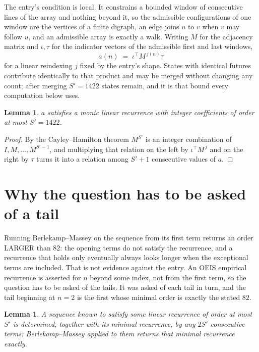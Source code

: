 \documentclass[11pt,a4paper]{article}
\theoremstyle{plain}
\newtheorem{lemma}[theorem]{Lemma}
\theoremstyle{definition}
\begin{document}
The entry's condition is local. It constrains a bounded window of consecutive lines of the
array and nothing beyond it, so the admissible configurations of one window are the vertices of
a finite digraph, an edge joins $u$ to $v$ when $v$ may follow $u$, and an admissible array is
exactly a walk. Writing $M$ for the adjacency matrix and $\iota,\tau$ for the indicator vectors
of the admissible first and last windows,
\[
a(n)\;=\;\iota^{\!\top}M^{\,j(n)}\tau
\]
for a linear reindexing $j$ fixed by the entry's shape. States with identical futures
contribute identically to that product and may be merged without changing any count; after
merging $S'=1422$ states remain, and it is that bound every computation below uses.

\begin{lemma}\label{lem:cf}
$a$ satisfies a monic linear recurrence with integer coefficients of order at most $S'=1422$.
\end{lemma}

\begin{proof}
By the Cayley--Hamilton theorem $M^{S'}$ is an integer combination of $I,M,\dots,M^{S'-1}$,
and multiplying that relation on the left by $\iota^{\!\top}M^{\,j}$ and on the right by
$\tau$ turns it into a relation among $S'+1$ consecutive values of $a$.
\end{proof}

\section{Why the question has to be asked of a tail}

Running Berlekamp--Massey on the sequence from its first term returns an order LARGER than $82$: the opening terms do not satisfy the recurrence, and a recurrence that holds only eventually always looks longer when the exceptional terms are included. That is not evidence against the entry. An OEIS empirical recurrence is asserted for $n$ beyond some index, not from the first term, so the question has to be asked of the tails. It was asked of each tail in turn, and the tail beginning at $n=2$ is the first whose minimal order is exactly the stated $82$.

\begin{lemma}\label{lem:bm}
A sequence known to satisfy some linear recurrence of order at most $S'$ is determined,
together with its minimal recurrence, by any $2S'$ consecutive terms: Berlekamp--Massey applied
to them returns that minimal recurrence exactly.
\end{lemma}
\end{document}
